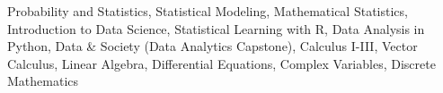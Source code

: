 Probability and Statistics, 
Statistical Modeling, 
Mathematical Statistics, 
Introduction to Data Science, 
Statistical Learning with R, 
Data Analysis in Python, 
Data \& Society (Data Analytics Capstone), 
Calculus I-III, 
Vector Calculus, 
Linear Algebra, 
Differential Equations, 
Complex Variables, 
Discrete Mathematics